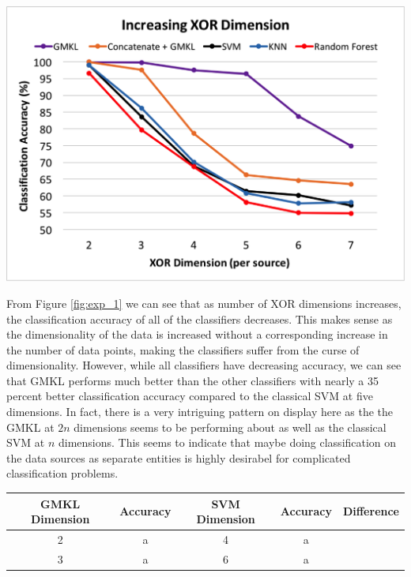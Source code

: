 \documentclass{article}
\begin{document}
\begin{minipage}{\textwidth}
\centering
\includegraphics[scale=0.4]{experimentpic1.png}
\label{fig:exp_1}
\end{minipage}


From Figure \ref{fig:exp_1} we can see that as number of XOR dimensions increases, the classification accuracy of all of the classifiers decreases. This makes sense as the dimensionality of the data is increased without a corresponding increase in the number of data points, making the classifiers suffer from the curse of dimensionality. However, while all classifiers have decreasing accuracy, we can see that GMKL performs much better than the other classifiers with nearly a 35 percent better classification accuracy compared to the classical SVM at five dimensions. In fact, there is a very intriguing pattern on display here as the the GMKL at $2n$ dimensions seems to be performing about as well as the classical SVM at $n$ dimensions. This seems to indicate that maybe doing classification on the data sources as separate entities is highly desirabel for complicated classification problems.

\begin{minipage}{\textwidth}
\centering
\begin{tabular}{|c| c| c| c| c| }
\hline
GMKL Dimension & Accuracy & SVM Dimension & Accuracy & Difference \\
\hline
2 & a & 4 & a \\
\hline
3 & a & 6 &a
\end{tabular}
\end{minipage}
\end{document}
